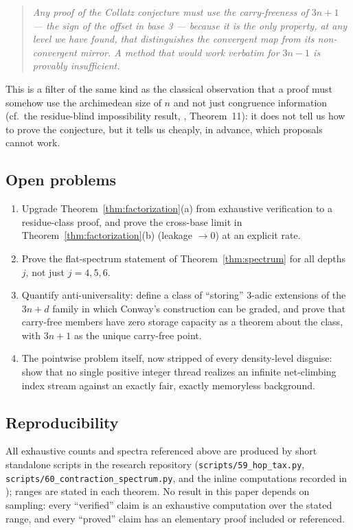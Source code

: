\documentclass[11pt]{article}
\theoremstyle{definition}
\begin{document}
\begin{quote}
\emph{Any proof of the Collatz conjecture must use the carry-freeness of $3n+1$ ---
the sign of the offset in base 3 --- because it is the only property, at any level we
have found, that distinguishes the convergent map from its non-convergent mirror. A
method that would work verbatim for $3n-1$ is provably insufficient.}
\end{quote}

This is a filter of the same kind as the classical observation that a proof must
somehow use the archimedean size of $n$ and not just congruence information (cf.\ the
residue-blind impossibility result, \cite{Note2026}, Theorem~11): it does not tell us
how to prove the conjecture, but it tells us cheaply, in advance, which proposals cannot
work.

\subsection*{Open problems}

\begin{enumerate}[label=(\Alph*)]
\item Upgrade Theorem~\ref{thm:factorization}(a) from exhaustive verification to a
residue-class proof, and prove the cross-base limit in
Theorem~\ref{thm:factorization}(b) (leakage $\to 0$) at an explicit rate.
\item Prove the flat-spectrum statement of Theorem~\ref{thm:spectrum} for all depths
$j$, not just $j = 4, 5, 6$.
\item Quantify anti-universality: define a class of ``storing'' $3$-adic extensions of
the $3n+d$ family in which Conway's construction can be graded, and prove that
carry-free members have zero storage capacity as a theorem about the class, with
$3n+1$ as the unique carry-free point.
\item The pointwise problem itself, now stripped of every density-level disguise:
show that no single positive integer thread realizes an infinite net-climbing index
stream against an exactly fair, exactly memoryless background.
\end{enumerate}

\subsection*{Reproducibility}

All exhaustive counts and spectra referenced above are produced by short standalone
scripts in the research repository (\texttt{scripts/59\_hop\_tax.py},
\texttt{scripts/60\_contraction\_spectrum.py}, and the inline computations recorded in
\cite{Note2026}); ranges are stated in each theorem. No result in this paper depends on
sampling: every ``verified'' claim is an exhaustive computation over the stated range,
and every ``proved'' claim has an elementary proof included or referenced.
\end{document}
